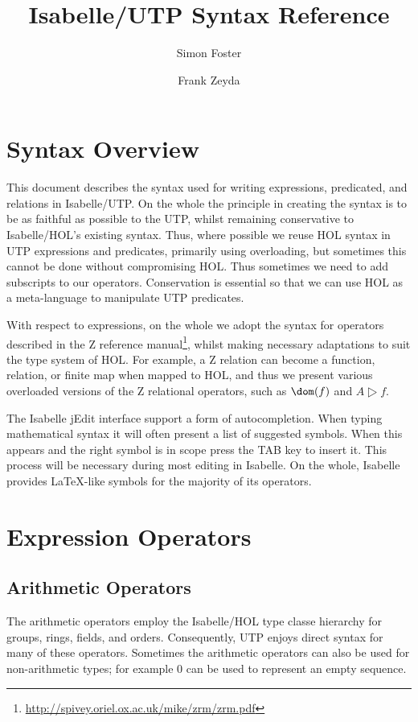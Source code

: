 \documentclass[11pt]{article}
\title{Isabelle/UTP Syntax Reference}
\author{Simon Foster \and Frank Zeyda}
\begin{document}
\maketitle

\section{Syntax Overview}

This document describes the syntax used for writing expressions, predicated, and relations in Isabelle/UTP. On the whole
the principle in creating the syntax is to be as faithful as possible to the UTP, whilst remaining conservative to
Isabelle/HOL's existing syntax. Thus, where possible we reuse HOL syntax in UTP expressions and predicates, primarily
using overloading, but sometimes this cannot be done without compromising HOL. Thus sometimes we need to add subscripts
to our operators. Conservation is essential so that we can use HOL as a meta-language to manipulate UTP predicates.

With respect to expressions, on the whole we adopt the syntax for operators described in the Z reference
manual\footnote{\url{http://spivey.oriel.ox.ac.uk/mike/zrm/zrm.pdf}}, whilst making necessary adaptations to suit the
type system of HOL. For example, a Z relation can become a function, relation, or finite map when mapped to HOL, and
thus we present various overloaded versions of the Z relational operators, such as $\dom(f)$ and $A \rres f$.

The Isabelle jEdit interface support a form of autocompletion. When typing mathematical syntax it will often present a
list of suggested symbols. When this appears and the right symbol is in scope press the TAB key to insert it. This
process will be necessary during most editing in Isabelle. On the whole, Isabelle provides \LaTeX-like symbols for the
majority of its operators.

\newpage

\section{Expression Operators}

\subsection{Arithmetic Operators}

The arithmetic operators employ the Isabelle/HOL type classe hierarchy for groups, rings, fields, and
orders. Consequently, UTP enjoys direct syntax for many of these operators. Sometimes the arithmetic operators can also
be used for non-arithmetic types; for example $0$ can be used to represent an empty sequence.
\end{document}

